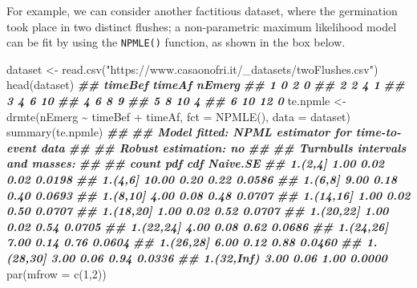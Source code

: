 \documentclass[
]{book}
\newenvironment{Shaded}{\begin{snugshade}}{\end{snugshade}}
\newcommand{\AttributeTok}[1]{\textcolor[rgb]{0.77,0.63,0.00}{#1}}
\newcommand{\DecValTok}[1]{\textcolor[rgb]{0.00,0.00,0.81}{#1}}
\newcommand{\DocumentationTok}[1]{\textcolor[rgb]{0.56,0.35,0.01}{\textbf{\textit{#1}}}}
\newcommand{\FunctionTok}[1]{\textcolor[rgb]{0.00,0.00,0.00}{#1}}
\newcommand{\NormalTok}[1]{#1}
\newcommand{\OtherTok}[1]{\textcolor[rgb]{0.56,0.35,0.01}{#1}}
\newcommand{\SpecialCharTok}[1]{\textcolor[rgb]{0.00,0.00,0.00}{#1}}
\newcommand{\StringTok}[1]{\textcolor[rgb]{0.31,0.60,0.02}{#1}}
\begin{document}
For example, we can consider another factitious dataset, where the germination took place in two distinct flushes; a non-parametric maximum likelihood model can be fit by using the \texttt{NPMLE()} function, as shown in the box below.

\begin{Shaded}
\begin{Highlighting}[]
\NormalTok{dataset }\OtherTok{\textless{}{-}} \FunctionTok{read.csv}\NormalTok{(}\StringTok{"https://www.casaonofri.it/\_datasets/twoFlushes.csv"}\NormalTok{)}
\FunctionTok{head}\NormalTok{(dataset)}
\DocumentationTok{\#\#   timeBef timeAf nEmerg}
\DocumentationTok{\#\# 1       0      2      0}
\DocumentationTok{\#\# 2       2      4      1}
\DocumentationTok{\#\# 3       4      6     10}
\DocumentationTok{\#\# 4       6      8      9}
\DocumentationTok{\#\# 5       8     10      4}
\DocumentationTok{\#\# 6      10     12      0}
\NormalTok{te.npmle }\OtherTok{\textless{}{-}} \FunctionTok{drmte}\NormalTok{(nEmerg }\SpecialCharTok{\textasciitilde{}}\NormalTok{ timeBef }\SpecialCharTok{+}\NormalTok{ timeAf, }\AttributeTok{fct =} \FunctionTok{NPMLE}\NormalTok{(),}
                \AttributeTok{data =}\NormalTok{ dataset)}
\FunctionTok{summary}\NormalTok{(te.npmle)}
\DocumentationTok{\#\# }
\DocumentationTok{\#\# Model fitted: NPML estimator for time{-}to{-}event data}
\DocumentationTok{\#\# }
\DocumentationTok{\#\# Robust estimation: no }
\DocumentationTok{\#\# }
\DocumentationTok{\#\# Turnbull\textquotesingle{}s intervals and masses:}
\DocumentationTok{\#\# }
\DocumentationTok{\#\#            count   pdf   cdf Naive.SE}
\DocumentationTok{\#\# 1.(2,4]     1.00  0.02  0.02   0.0198}
\DocumentationTok{\#\# 1.(4,6]    10.00  0.20  0.22   0.0586}
\DocumentationTok{\#\# 1.(6,8]     9.00  0.18  0.40   0.0693}
\DocumentationTok{\#\# 1.(8,10]    4.00  0.08  0.48   0.0707}
\DocumentationTok{\#\# 1.(14,16]   1.00  0.02  0.50   0.0707}
\DocumentationTok{\#\# 1.(18,20]   1.00  0.02  0.52   0.0707}
\DocumentationTok{\#\# 1.(20,22]   1.00  0.02  0.54   0.0705}
\DocumentationTok{\#\# 1.(22,24]   4.00  0.08  0.62   0.0686}
\DocumentationTok{\#\# 1.(24,26]   7.00  0.14  0.76   0.0604}
\DocumentationTok{\#\# 1.(26,28]   6.00  0.12  0.88   0.0460}
\DocumentationTok{\#\# 1.(28,30]   3.00  0.06  0.94   0.0336}
\DocumentationTok{\#\# 1.(32,Inf)  3.00  0.06  1.00   0.0000}
\FunctionTok{par}\NormalTok{(}\AttributeTok{mfrow =} \FunctionTok{c}\NormalTok{(}\DecValTok{1}\NormalTok{,}\DecValTok{2}\NormalTok{))}


\end{Highlighting}
\end{Shaded}
\end{document}
